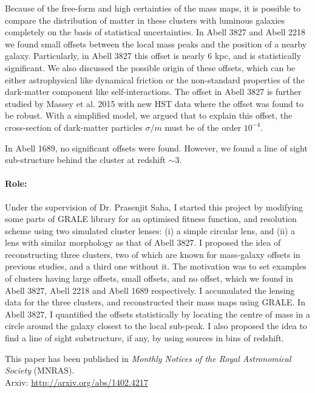 \documentclass[
  11pt,
  twoside,
  openright,
  titlepage,
  headings=optiontoheadandtoc
]{scrbook}
\begin{document}
Because of the free-form and high certainties of the mass maps, 
it is possible to compare the distribution
of matter in these clusters with luminous galaxies
completely on the basis of statistical uncertainties. In Abell 3827 and
Abell 2218 we found small offsets between the local mass peaks and the
position of a nearby galaxy. Particularly, in Abell 3827 this offset is nearly 6 kpc,
and is statistically significant. We also discussed the possible origin 
of these offsets, which can be either astrophysical like dynamical
friction or the non-standard properties of the dark-matter component like
self-interactions. 
The offset in Abell 3827 is further studied by Massey et al. 2015 with new HST
data where the offset was found to be robust. With a simplified model, we argued that
to explain this offset, the cross-section of dark-matter particles 
$\sigma/m$ must be of the order $10^{-4}$.

In Abell 1689, no significant offsets were found. However,  
we found a line of sight sub-structure behind the cluster at
redshift $\sim 3$. 

\paragraph{Role:} Under the supervision of Dr. Prasenjit Saha,
I started this project by modifying some parts of 
GRALE library for an optimised fitness function, and resolution scheme
using two simulated cluster lenses: (i) a simple circular lens, and 
(ii) a lens with similar morphology as that of Abell 3827. I proposed the
idea of reconstructing three clusters, two of which are known for
mass-galaxy offsets in previous studies, 
and a third one without it. The motivation was to set examples 
of clusters having large offsets, small offsets, and no offset, which we
found in Abell 3827, Abell 2218 and Abell 1689 respectively. I accumulated
the lensing data for the three clusters, and reconstructed their mass 
maps using GRALE. In Abell 3827, I quantified the offsets statistically
by locating the centre of mass in a circle around the galaxy closest to 
the local sub-peak. I also proposed the idea to find a line of sight
substructure, if any, by using sources in bins of redshift.


This paper has been published in {\it Monthly Notices of the Royal Astronomical
Society} (MNRAS). 
\\
Arxiv: \url{http://arxiv.org/abs/1402.4217}
\end{document}
